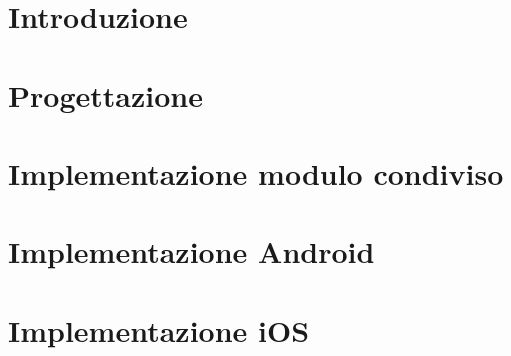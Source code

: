 
\section{Introduzione}

\section{Progettazione}

\section{Implementazione modulo condiviso}

\section{Implementazione Android}

\section{Implementazione iOS}
